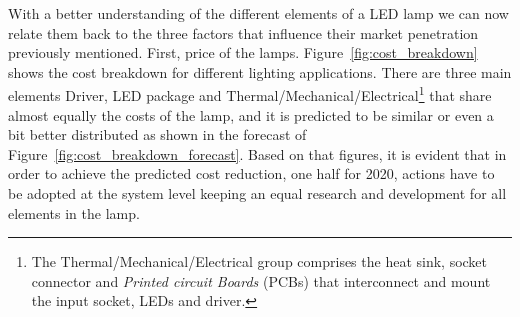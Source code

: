 With a better understanding of the different elements of a LED lamp we can now relate them back to the three factors that influence their market penetration previously mentioned. First, price of the lamps. Figure~\ref{fig:cost_breakdown} shows the cost breakdown for different lighting applications. There are three main elements Driver, LED package and Thermal/Mechanical/Electrical\footnote{The Thermal/Mechanical/Electrical group comprises the heat sink, socket connector and \emph{Printed circuit Boards} (PCBs) that interconnect and mount the input socket, LEDs and driver.} that share  almost equally the costs of the lamp, and it is predicted to be similar or even a bit better distributed as shown in the forecast of Figure~\ref{fig:cost_breakdown_forecast}. Based on that figures, it is evident that in order to achieve the predicted cost reduction, one half for 2020, actions have to be adopted at the system level keeping an equal research and development for all elements in the lamp. 

